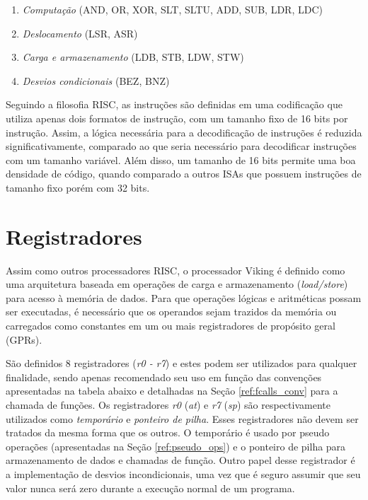 \documentclass{extreport}
\begin{document}
\begin{enumerate}
\item \textit{Computação} (AND, OR, XOR, SLT, SLTU, ADD, SUB, LDR, LDC)
\item \textit{Deslocamento} (LSR, ASR)
\item \textit{Carga e armazenamento} (LDB, STB, LDW, STW)
\item \textit{Desvios condicionais} (BEZ, BNZ)
\end{enumerate}

Seguindo a filosofia RISC, as instruções são definidas em uma codificação que utiliza apenas dois formatos de instrução, com um tamanho fixo de 16 bits por instrução. Assim, a lógica necessária para a decodificação de instruções é reduzida significativamente, comparado ao que seria necessário para decodificar instruções com um tamanho variável. Além disso, um tamanho de 16 bits permite uma boa densidade de código, quando comparado a outros ISAs que possuem instruções de tamanho fixo porém com 32 bits.

\section{Registradores}
Assim como outros processadores RISC, o processador Viking é definido como uma arquitetura baseada em operações de carga e armazenamento (\textit{load/store}) para acesso à memória de dados. Para que operações lógicas e aritméticas possam ser executadas, é necessário que os operandos sejam trazidos da memória ou carregados como constantes em um ou mais registradores de propósito geral (GPRs).

São definidos 8 registradores (\textit{r0 - r7}) e estes podem ser utilizados para qualquer finalidade, sendo apenas recomendado seu uso em função das convenções apresentadas na tabela abaixo e detalhadas na Seção \ref{ref:fcalls_conv} para a chamada de funções. Os registradores \textit{r0} (\textit{at}) e \textit{r7} (\textit{sp}) são respectivamente utilizados como \textit{temporário} e \textit{ponteiro de pilha}. Esses registradores não devem ser tratados da mesma forma que os outros. O temporário é usado por pseudo operações (apresentadas na Seção \ref{ref:pseudo_ops}) e o ponteiro de pilha para armazenamento de dados e chamadas de função. Outro papel desse registrador é a implementação de desvios incondicionais, uma vez que é seguro assumir que seu valor nunca será zero durante a execução normal de um programa.
\end{document}
